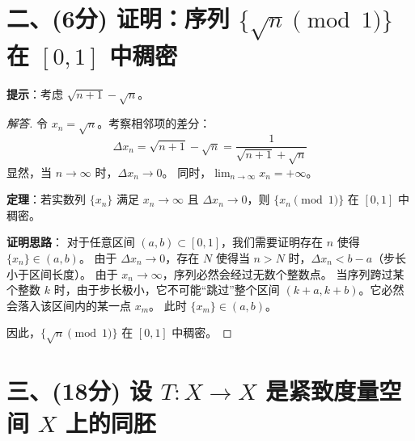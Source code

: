 \documentclass[a4paper,12pt]{article}
\newenvironment{solution}{\begin{proof}[解答]}{\end{proof}}
\begin{document}
\section*{二、(6分) 证明：序列 $\{\sqrt{n} \pmod 1\}$ 在 $[0, 1]$ 中稠密}

\textbf{提示}：考虑 $\sqrt{n+1} - \sqrt{n}$。

\begin{solution}
    令 $x_n = \sqrt{n}$。考察相邻项的差分：
    $$ \Delta x_n = \sqrt{n+1} - \sqrt{n} = \frac{1}{\sqrt{n+1} + \sqrt{n}} $$
    显然，当 $n \to \infty$ 时，$\Delta x_n \to 0$。
    同时，$\lim_{n \to \infty} x_n = +\infty$。
    
    \textbf{定理}：若实数列 $\{x_n\}$ 满足 $x_n \to \infty$ 且 $\Delta x_n \to 0$，则 $\{x_n \pmod 1\}$ 在 $[0, 1]$ 中稠密。
    
    \textbf{证明思路}：
    对于任意区间 $(a, b) \subset [0, 1]$，我们需要证明存在 $n$ 使得 $\{x_n\} \in (a, b)$。
    由于 $\Delta x_n \to 0$，存在 $N$ 使得当 $n > N$ 时，$\Delta x_n < b-a$（步长小于区间长度）。
    由于 $x_n \to \infty$，序列必然会经过无数个整数点。
    当序列跨过某个整数 $k$ 时，由于步长极小，它不可能“跳过”整个区间 $(k+a, k+b)$。它必然会落入该区间内的某一点 $x_m$。
    此时 $\{x_m\} \in (a, b)$。
    
    因此，$\{\sqrt{n} \pmod 1\}$ 在 $[0, 1]$ 中稠密。
\end{solution}

\section*{三、(18分) 设 $T: X \to X$ 是紧致度量空间 $X$ 上的同胚}
\end{document}
